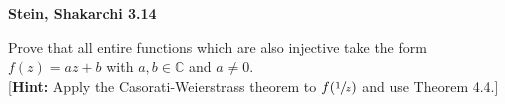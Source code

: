 \textbf{Stein, Shakarchi 3.14}

Prove that all entire functions which are also injective take the form $f(z) = az + b$ with $a, b \in \mathbb{C}$ and 
$a \ne 0$.
\ \\

[\textbf{Hint:} Apply the Casorati-Weierstrass theorem to $f(\sfrac{1}{z})$ and use Theorem 4.4.]

\begin{solution}
  \ \\
\end{solution}